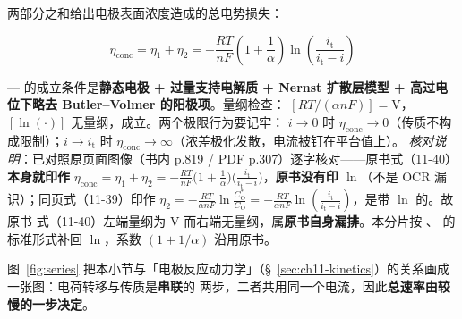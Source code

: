 两部分之和给出电极表面浓度造成的总电势损失：

\begin{equation}
\eta_{\mathrm{conc}}=\eta_1+\eta_2
=-\frac{RT}{nF}\left(1+\frac{1}{\alpha}\right)
\ln\!\left(\frac{i_{\mathrm{t}}}{i_{\mathrm{t}}-i}\right)
\label{eq:eta-conc}
\end{equation}

\begin{keycond}
— 的成立条件是\textbf{静态电极 + 过量支持电解质 +
Nernst 扩散层模型 + 高过电位下略去 Butler--Volmer 的阳极项}。量纲检查：
$[RT/(\alpha nF)]=\mathrm{V}$，$[\ln(\cdot)]$ 无量纲，成立。两个极限行为要记牢：
$i\to 0$ 时 $\eta_{\mathrm{conc}}\to 0$（传质不构成限制）；$i\to i_{\mathrm{t}}$ 时
$\eta_{\mathrm{conc}}\to\infty$（浓差极化发散，电流被钉在平台值上）。
\emph{核对说明}：已对照原页面图像（书内 p.819 / PDF p.307）逐字核对——原书式（11-40）
\textbf{本身就印作}
$\eta_{\mathrm{conc}}=\eta_1+\eta_2=-\frac{RT}{nF}\bigl(1+\frac{1}{\alpha}\bigr)
\bigl(\frac{i_{\mathrm{t}}}{i_{\mathrm{t}}-i}\bigr)$，\textbf{原书没有印 $\ln$}（不是 OCR
漏识）；同页式（11-39）印作 $\eta_2=-\frac{RT}{\alpha nF}\ln\frac{C_{\mathrm{O}}^*}{C_{\mathrm{O}}}
=-\frac{RT}{\alpha nF}\ln(\frac{i_{\mathrm{t}}}{i_{\mathrm{t}}-i})$，是带 $\ln$ 的。故原书
式（11-40）左端量纲为 V 而右端无量纲，属\textbf{原书自身漏排}。本分片按
、 的标准形式补回 $\ln$，系数 $(1+1/\alpha)$ 沿用原书。
\end{keycond}

图~\ref{fig:series} 把本小节与「电极反应动力学」（§~\ref{sec:ch11-kinetics}）的关系画成一张图：电荷转移与传质是\textbf{串联}的
两步，二者共用同一个电流，因此\textbf{总速率由较慢的一步决定}。

